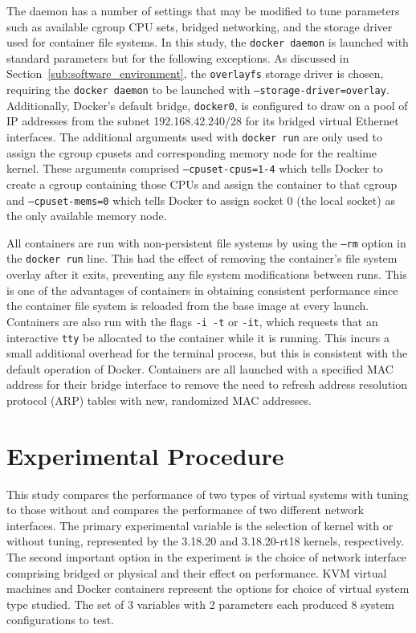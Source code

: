 The daemon has a number of settings that may be modified to tune parameters such as available cgroup CPU sets, bridged networking, and the storage driver used for container file systems.
In this study, the \texttt{docker daemon} is launched with standard parameters but for the following exceptions.
As discussed in Section~\ref{sub:software_environment}, the \texttt{overlayfs} storage driver is chosen, requiring the \texttt{docker daemon} to be launched with \texttt{--storage-driver=overlay}.  
Additionally, Docker's default bridge, \texttt{docker0}, is configured to draw on a pool of IP addresses from the subnet 192.168.42.240/28 for its bridged virtual Ethernet interfaces.
The additional arguments used with \texttt{docker run} are only used to assign the cgroup cpusets and corresponding memory node for the realtime kernel.  
These arguments comprised \texttt{--cpuset-cpus=1-4} which tells Docker to create a cgroup containing those CPUs and assign the container to that cgroup and \texttt{--cpuset-mems=0} which tells Docker to assign socket 0 (the local socket) as the only available memory node.

All containers are run with non-persistent file systems by using the \texttt{--rm} option in the \texttt{docker run} line.
This had the effect of removing the container's file system overlay after it exits, preventing any file system modifications between runs.
This is one of the advantages of containers in obtaining consistent performance since the container file system is reloaded from the base image at every launch.
Containers are also run with the flags \texttt{-i -t} or \texttt{-it}, which requests that an interactive \texttt{tty} be allocated to the container while it is running.
This incurs a small additional overhead for the terminal process, but this is consistent with the default operation of Docker.  
Containers are all launched with a specified MAC address for their bridge interface to remove the need to refresh address resolution protocol (ARP) tables with new, randomized MAC addresses.



\section{Experimental Procedure} %
\label{sec:experimental_procedure}
This study compares the performance of two types of virtual systems with tuning to those without and compares the performance of two different network interfaces.
The primary experimental variable is the selection of kernel with or without tuning, represented by the 3.18.20 and 3.18.20-rt18 kernels, respectively.  
The second important option in the experiment is the choice of network interface comprising bridged or physical and their effect on performance.
KVM virtual machines and Docker containers represent the options for choice of virtual system type studied.
The set of 3 variables with 2 parameters each produced 8 system configurations to test.

